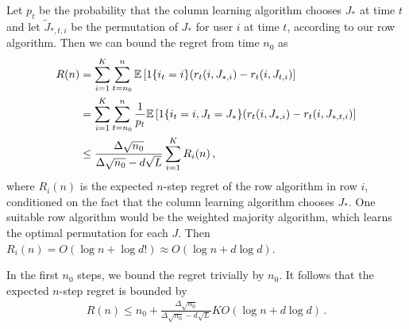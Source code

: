 Let $p_t$ be the probability that the column learning algorithm chooses $J_\ast$ at time $t$ and let $\tilde{J}_{\ast, t, i}$ be the permutation of $J_\ast$ for user $i$ at time $t$, according to our row algorithm. Then we can bound the regret from time $n_0$ as
\begin{align*}
  R(n)
  & = \sum_{i = 1}^K \sum_{t = n_0}^n \mathbb{E}\left[1\{i_t = i\} (r_t(i, J_{\ast, i}) - r_t(i, J_{t, i})\right] \\
  & = \sum_{i = 1}^K \sum_{t = n_0}^n \frac{1}{p_t} \mathbb{E}\left[1\{i_t = i, J_t = J_\ast\} (r_t(i, J_{\ast, i}) - r_t(i, J_{\ast, t, i})\right] \\
  & \leq \frac{\Delta \sqrt{n_0}}{\Delta \sqrt{n_0} - d \sqrt{L}} \sum_{i = 1}^K R_i(n)\,,
\end{align*}
where $R_i(n)$ is the expected $n$-step regret of the row algorithm in row $i$, conditioned on the fact that the column learning algorithm chooses $J_\ast$. One suitable row algorithm would be the weighted majority algorithm, which learns the optimal permutation for each $J$. Then $R_i(n) = O(\log n + \log d!) \approx O(\log n + d \log d)$.

In the first $n_0$ steps, we bound the regret trivially by $n_0$. It follows that the expected $n$-step regret is bounded by
\begin{align*}
  R(n) \leq
  n_0 + \frac{\Delta \sqrt{n_0}}{\Delta \sqrt{n_0} - d \sqrt{L}} K O(\log n + d \log d)\,.
\end{align*}
